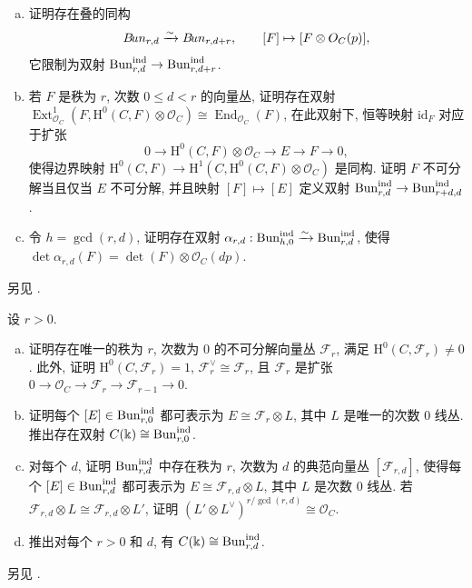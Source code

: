 \begin{exercise}[中等]\label{src:9.1.43}
\begin{enumerate}[(a)]
\item 证明存在叠的同构
\[
B\!un_{r,d}\xrightarrow{\sim}B\!un_{r,d+r},\qquad[F]\mapsto[F\otimes O_C(p)],
\]
它限制为双射 $\operatorname{Bun}_{r,d}^{\mathrm{ind}}\to\operatorname{Bun}_{r,d+r}^{\mathrm{ind}}$.
\item 若 $F$ 是秩为 $r$, 次数 $0\leq d<r$ 的向量丛, 证明存在双射 $\operatorname{Ext}_{\mathcal O_C}^1(F,\mathrm H^0(C,F)\otimes\mathcal O_C)\cong\operatorname{End}_{\mathcal O_C}(F)$, 在此双射下, 恒等映射 $\mathrm{id}_F$ 对应于扩张
\[
0\to\mathrm H^0(C,F)\otimes\mathcal O_C\to E\to F\to0,
\]
使得边界映射 $\mathrm H^0(C,F)\to\mathrm H^1(C,\mathrm H^0(C,F)\otimes\mathcal O_C)$ 是同构. 证明 $F$ 不可分解当且仅当 $E$ 不可分解, 并且映射 $[F]\mapsto[E]$ 定义双射 $\operatorname{Bun}_{r,d}^{\mathrm{ind}}\to\operatorname{Bun}_{r+d,d}^{\mathrm{ind}}$.
\item 令 $h=\gcd(r,d)$, 证明存在双射 $\alpha_{r,d}:\operatorname{Bun}_{h,0}^{\mathrm{ind}}\xrightarrow{\sim}\operatorname{Bun}_{r,d}^{\mathrm{ind}}$, 使得 $\det\alpha_{r,d}(F)=\det(F)\otimes\mathcal O_C(dp)$.
\end{enumerate}
另见 \cite[引理 10, 定理 6]{Ati57}.
\end{exercise}
\begin{exercise}[困难]\label{src:9.1.44}
设 $r>0$.
\begin{enumerate}[(a)]
\item 证明存在唯一的秩为 $r$, 次数为 $0$ 的不可分解向量丛 $\mathcal F_r$, 满足 $\mathrm H^0(C,\mathcal F_r)\ne0$. 此外, 证明 $\mathrm H^0(C,\mathcal F_r)=1$, $\mathcal F_r^\vee\cong\mathcal F_r$, 且 $\mathcal F_r$ 是扩张 $0\to\mathcal O_C\to\mathcal F_r\to\mathcal F_{r-1}\to0$.
\item 证明每个 $[E]\in\operatorname{Bun}_{r,0}^{\mathrm{ind}}$ 都可表示为 $E\cong\mathcal F_r\otimes L$, 其中 $L$ 是唯一的次数 $0$ 线丛. 推出存在双射 $C(\Bbbk)\cong\operatorname{Bun}_{r,0}^{\mathrm{ind}}$.
\item 对每个 $d$, 证明 $\operatorname{Bun}_{r,d}^{\mathrm{ind}}$ 中存在秩为 $r$, 次数为 $d$ 的典范向量丛 $[\mathcal F_{r,d}]$, 使得每个 $[E]\in\operatorname{Bun}_{r,d}^{\mathrm{ind}}$ 都可表示为 $E\cong\mathcal F_{r,d}\otimes L$, 其中 $L$ 是次数 $0$ 线丛. 若 $\mathcal F_{r,d}\otimes L\cong\mathcal F_{r,d}\otimes L'$, 证明 $(L'\otimes L^\vee)^{r/\gcd(r,d)}\cong\mathcal O_C$.
\item 推出对每个 $r>0$ 和 $d$, 有 $C(\Bbbk)\cong\operatorname{Bun}_{r,d}^{\mathrm{ind}}$.
\end{enumerate}
另见 \cite[定理 10]{Ati57}.
\end{exercise}
